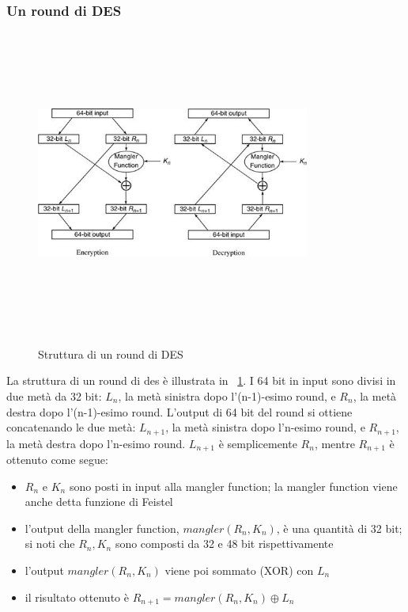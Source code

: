 \subsubsection{Un round di DES}
\begin{figure}[htbp]
	\centering%
	\subfigure%
	{\includegraphics[height=10cm, width=9cm, keepaspectratio]{Immagini/chiave_segreta/round_des.png}}
	\caption{Struttura di un round di DES \label{fig:round_des}} 	
\end{figure}
La struttura di un round di des è illustrata in \figurename ~\ref{fig:round_des}. I 64 bit in input sono divisi in due metà da 32 bit: $L_{n}$, la metà sinistra dopo l'(n-1)-esimo round, e $R_{n}$, la metà destra dopo l'(n-1)-esimo round. L'output di 64 bit del round si ottiene concatenando le due metà: $L_{n + 1}$, la metà sinistra dopo l'n-esimo round, e $R_{n + 1}$, la metà destra dopo l'n-esimo round. $L_{n+1}$ è semplicemente $R_{n}$, mentre $R_{n + 1}$ è ottenuto come segue:
\begin{itemize}
  \item $R_{n}$ e $K_{n}$ sono posti in input alla mangler function; la mangler function viene anche detta funzione di Feistel
  \item l'output della mangler function, $mangler(R_{n}, K_{n})$, è una quantità di 32 bit; si noti che $R_{n}, K_{n}$ sono composti da
32 e 48 bit rispettivamente
  \item l'output $mangler(R_{n}, K_{n})$ viene poi sommato (XOR) con $L_{n}$
  \item il risultato ottenuto è $R_{n+1} = mangler(R_{n}, K_{n}) \oplus L_{n}$
\end{itemize}
